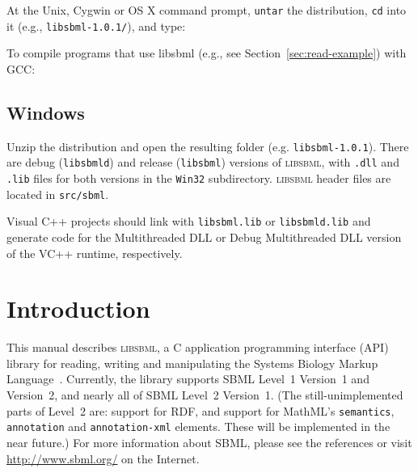 \documentclass{cekmanual}
\begin{document}
At the Unix, Cygwin or OS X command prompt, \texttt{untar} the
distribution, \texttt{cd} into it (e.g., \texttt{libsbml-1.0.1/}), and
type:

\begin{example}
\end{example}

To compile programs that use libsbml (e.g., see
Section~\ref{sec:read-example}) with GCC:

\begin{example}
\end{example}


\subsection{Windows}

Unzip the distribution and open the resulting folder
(e.g. \texttt{libsbml-1.0.1}).  There are debug (\texttt{libsbmld})
and release (\texttt{libsbml}) versions of \textsc{libsbml}, with
\texttt{.dll} and \texttt{.lib} files for both versions in the
\texttt{Win32} subdirectory.  \textsc{libsbml} header files are
located in \texttt{src/sbml}.

Visual C++ projects should link with \texttt{libsbml.lib} or
\texttt{libsbmld.lib} and generate code for the Multithreaded DLL or
Debug Multithreaded DLL version of the VC++ runtime, respectively.


\section{Introduction}
\label{sec:introduction}

This manual describes \textsc{libsbml}, a C application programming
interface (API) library for reading, writing and manipulating the Systems
Biology Markup
Language~\citep[SBML;][]{hucka:2001,hucka:2003,finney:2003c}.  Currently,
the library supports SBML Level~1 Version~1 and Version~2, and nearly all
of SBML Level~2 Version~1.  (The still-unimplemented parts of Level~2 are:
support for RDF, and support for MathML's \texttt{semantics},
\texttt{annotation} and \texttt{annotation-xml} elements.  These will be
implemented in the near future.)  For more information about SBML, please
see the references or visit \url{http://www.sbml.org/} on the Internet.
\end{document}

